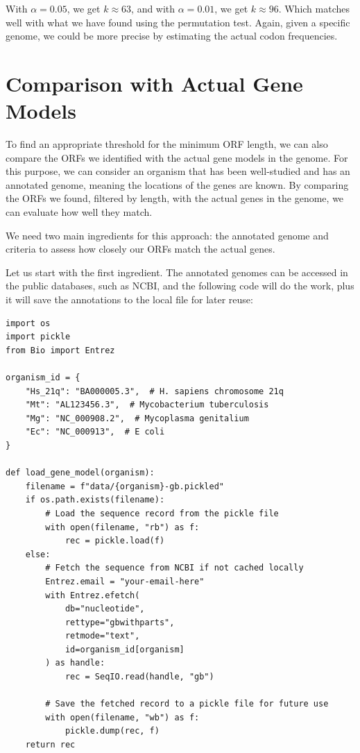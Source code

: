 With $\alpha = 0.05$, we get $k\approx 63$, and with $\alpha = 0.01$, we get $k\approx 96$. Which matches well with what we have found using the permutation test. Again, given a specific genome, we could be more precise by estimating the actual codon frequencies.

\section{Comparison with Actual Gene Models}

To find an appropriate threshold for the minimum ORF length, we can also compare the ORFs we identified with the actual gene models in the genome. For this purpose, we can consider an organism that has been well-studied and has an annotated genome, meaning the locations of the genes are known. By comparing the ORFs we found, filtered by length, with the actual genes in the genome, we can evaluate how well they match.

We need two main ingredients for this approach: the annotated genome and criteria to assess how closely our ORFs match the actual genes.

Let us start with the first ingredient. The annotated genomes can be accessed in the public databases, such as NCBI, and the following code will do the work, plus it will save the annotations to the local file for later reuse:

\vspace*{3mm}
\begin{lstlisting}
import os
import pickle
from Bio import Entrez

organism_id = {
    "Hs_21q": "BA000005.3",  # H. sapiens chromosome 21q
    "Mt": "AL123456.3",  # Mycobacterium tuberculosis
    "Mg": "NC_000908.2",  # Mycoplasma genitalium
    "Ec": "NC_000913",  # E coli
}

def load_gene_model(organism):
    filename = f"data/{organism}-gb.pickled"
    if os.path.exists(filename):
        # Load the sequence record from the pickle file
        with open(filename, "rb") as f:
            rec = pickle.load(f)
    else:
        # Fetch the sequence from NCBI if not cached locally
        Entrez.email = "your-email-here"
        with Entrez.efetch(
            db="nucleotide",
            rettype="gbwithparts",
            retmode="text",
            id=organism_id[organism]
        ) as handle:
            rec = SeqIO.read(handle, "gb")
        
        # Save the fetched record to a pickle file for future use
        with open(filename, "wb") as f:
            pickle.dump(rec, f)
    return rec
\end{lstlisting}


